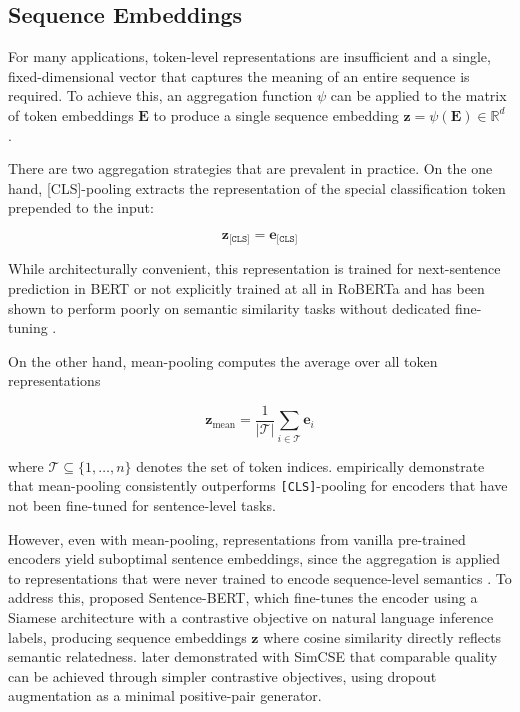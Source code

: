 
\subsection{Sequence Embeddings}

For many applications, token-level representations are insufficient and a single, fixed-dimensional vector that captures the meaning of an entire sequence is required. To achieve this, an aggregation function $\psi$ can be applied to the matrix of token embeddings $\mathbf{E}$ to produce a single sequence embedding $\mathbf{z} = \psi(\mathbf{E}) \in \mathbb{R}^d$ \cite{xing2025comparative}. 

There are two aggregation strategies that are prevalent in practice. On the one hand, [CLS]-pooling extracts the representation of the special classification token prepended to the input:

\begin{equation}
    \mathbf{z}_{\texttt{[CLS]}} = \mathbf{e}_{\texttt{[CLS]}}
    \label{eq:cls_pooling}
\end{equation}

While architecturally convenient, this representation is trained for next-sentence prediction in \ac{BERT} or not explicitly trained at all in RoBERTa and has been shown to perform poorly on semantic similarity tasks without dedicated fine-tuning \cite{reimers2019sentence,devlin_2019_bert,Li_2020_Sentence}.

On the other hand, mean-pooling computes the average over all token representations

\begin{equation}
    \mathbf{z}_{\text{mean}} = \frac{1}{|\mathcal{T}|} 
    \sum_{i \in \mathcal{T}} \mathbf{e}_i
    \label{eq:mean_pooling}
\end{equation}

where $\mathcal{T} \subseteq \{1, \ldots, n\}$ denotes the set of token indices. \citet{reimers2019sentence} empirically demonstrate that mean-pooling consistently outperforms \texttt{[CLS]}-pooling for encoders that have not been fine-tuned for sentence-level tasks.

However, even with mean-pooling, representations from vanilla pre-trained encoders yield suboptimal sentence embeddings, since the aggregation is applied to representations that were never trained to encode sequence-level semantics \cite{reimers2019sentence, Li_2020_Sentence}. To address this, \citet{reimers2019sentence} proposed Sentence-\ac{BERT}, which fine-tunes the encoder using a Siamese architecture with a contrastive objective on natural language inference labels, producing sequence embeddings $\mathbf{z}$ where cosine similarity directly reflects semantic relatedness. \citet{gao-etal-2021-simcse} later demonstrated with SimCSE that comparable quality can be achieved through simpler contrastive objectives, using dropout augmentation as a minimal positive-pair generator. 


